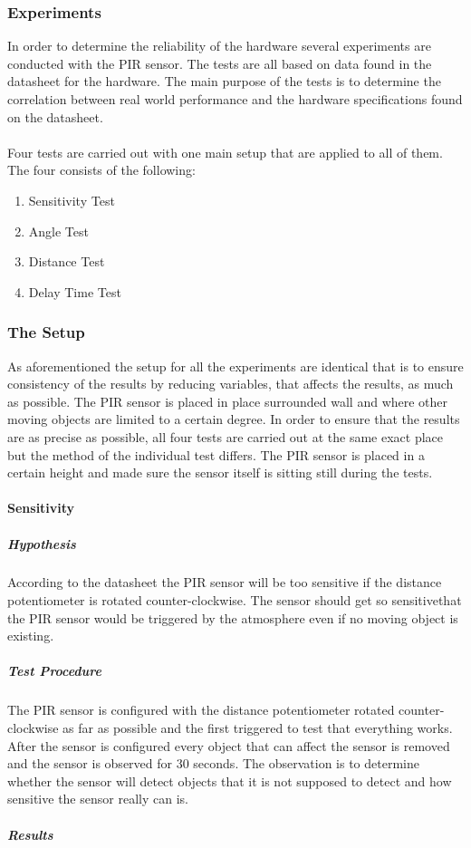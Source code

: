\subsubsection{Experiments}
\label{sub:Experiments}
In order to determine the reliability of the hardware several experiments are conducted with the PIR sensor.
The tests are all based on data found in the datasheet for the hardware.
The main purpose of the tests is to determine the correlation between real world performance and the hardware specifications
found on the datasheet.
\\\\
Four tests are carried out with one main setup that are applied to all of them. The four consists of the following:

\begin{enumerate}
  \item Sensitivity Test
  \item Angle Test
  \item Distance Test
  \item Delay Time Test
\end{enumerate}
\subsubsection{The Setup}
\label{subs:The Setup}
As aforementioned the setup for all the experiments are identical
that is to ensure consistency of the results by reducing variables, that affects
the results, as much as possible.  The PIR sensor is placed in place surrounded wall
and where other moving objects are limited to a certain degree. In order to ensure that the
results are as precise as possible, all four tests are carried out at the same exact place but
the method of the individual test differs.
The PIR sensor is placed in a certain height and made sure the sensor itself is
sitting still during the tests.
\paragraph{Sensitivity}
\label{par:Sensitivity}

\subparagraph{Hypothesis}
\label{subp:SenHypothesis}
According to the datasheet the PIR sensor will be too sensitive if the distance potentiometer is rotated counter-clockwise.
The sensor should get so sensitivethat the PIR sensor would be triggered by the atmosphere even
if no moving object is existing\cite{datasheet_pir1}.
\subparagraph{Test Procedure}
\label{subp:SenTest Procedure}
The PIR sensor is configured with the distance potentiometer rotated
counter-clockwise as far as possible and the first triggered to test that everything works.
After the sensor is configured every object that can affect the sensor is
removed and the sensor is observed for 30 seconds.
The observation is to determine whether the sensor will detect objects that it is not
supposed to detect and how sensitive the sensor really can is.
\subparagraph{Results}
\label{subp:SenResults}

